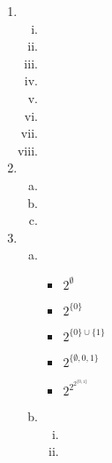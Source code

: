 \documentclass{article}
\begin{document}
\begin{enumerate}
\begin{enumerate}[(a)]
\begin{enumerate}[(i)]
    \end{enumerate}
  \end{enumerate}

  \item
  \begin{enumerate}[(i)]
    \item %

    \item %

    \item %

    \item %

    \item %

    \item %

    \item %

    \item %

  \end{enumerate}

  \item
  \begin{enumerate}[(a)]
    \item %

    \item %

    \item %

  \end{enumerate}

  \item
  \begin{enumerate}[(a)]
    \item %
    \begin{itemize}
      \item $2^{\emptyset}$

      \item $2^{\{0\}}$

      \item $2^{\{0\} \cup \{1\}}$

      \item $2^{\{\emptyset, 0, 1\}}$

      \item $2^{2^{2^{\{0,1\}}}}$

    \end{itemize}

    \item %
    \begin{enumerate}[(i)]
      \item %

      \item %

    \end{enumerate}

  \end{enumerate}
\end{enumerate}
\end{document}
